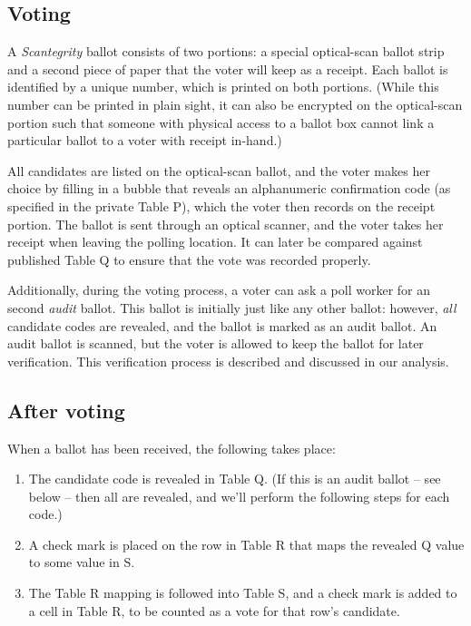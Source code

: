\documentclass[10pt,twocolumn]{article}
\newcommand{\term}[1]{\textit{#1}}
\begin{document}
\subsection{Voting}

A \term{Scantegrity} ballot consists of two portions: a special optical-scan ballot strip and a second
piece of paper that the voter will keep as a receipt. Each ballot is identified by a unique number,
which is printed on both portions. (While this number can be printed in plain sight, it can also be
encrypted on the optical-scan portion such that someone with physical access to a ballot box cannot
link a particular ballot to a voter with receipt in-hand.)

All candidates are listed on the optical-scan ballot, and the voter makes her choice by filling
in a bubble that reveals an alphanumeric confirmation code (as specified in the private Table
P), which the voter then records on the receipt portion. The ballot is sent through an optical
scanner, and the voter takes her receipt when leaving the polling location. It can later be
compared against published Table Q to ensure that the vote was recorded properly.

Additionally, during the voting process, a voter can ask a poll worker for an second \term{audit}
ballot. This ballot is initially just like any other ballot: however, \emph{all} candidate codes are
revealed, and the ballot is marked as an audit ballot. An audit ballot is scanned, but the voter is
allowed to keep the ballot for later verification. This verification process is described and
discussed in our analysis.

\subsection{After voting}

When a ballot has been received, the following takes place:
\begin{enumerate}
	\item
		The candidate code is revealed in Table Q. (If this is an audit ballot -- see below -- then all
		are revealed, and we'll perform the following steps for each code.)
	\item
		A check mark is placed on the row in Table R that maps the revealed Q value to some value in S.
	\item
		The Table R mapping is followed into Table S, and a check mark is added to a cell in Table R,
		to be counted as a vote for that row's candidate.
\end{enumerate}
\end{document}
